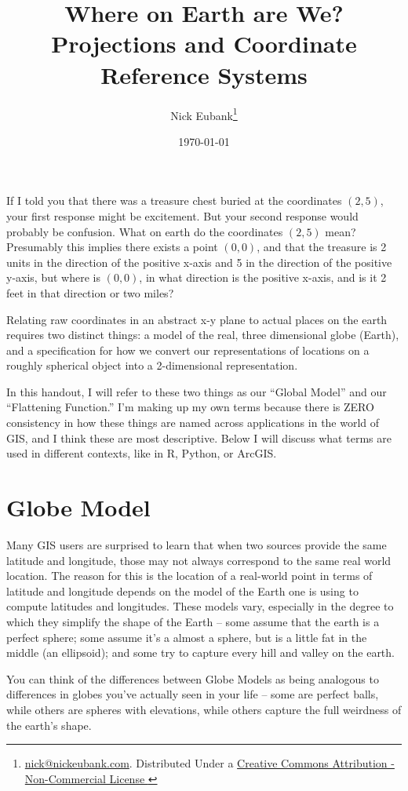 \documentclass[11pt]{article}
\title{Where on Earth are We? \\ Projections and Coordinate Reference Systems}
\author{Nick Eubank\footnote{\href{mailto:nick@nickeubank.com}{nick@nickeubank.com}. Distributed Under a \href{https://creativecommons.org/licenses/by-nc/4.0/}{Creative Commons Attribution - Non-Commercial License \ccbync}}}
\date{\today}
\begin{document}
\maketitle

If I told you that there was a treasure chest buried at the coordinates $(2, 5)$, your first response might be excitement. But your second response would probably be confusion. What on earth do the coordinates $(2, 5)$ mean? Presumably this implies there exists a point $(0, 0)$, and that the treasure is 2 units in the  direction of the positive x-axis and 5 in the direction of the positive y-axis, but where is $(0,0)$, in what direction is the positive x-axis, and is it 2 feet in that direction or two miles?

Relating raw coordinates in an abstract x-y plane to actual places on the earth requires two distinct things: a model of the real, three dimensional globe (Earth), and a specification for how we convert our representations of locations on a roughly spherical object into a 2-dimensional representation.

In this handout, I will refer to these two things as our ``Global Model'' and our ``Flattening Function.'' I'm making up my own terms because there is ZERO consistency in how these things are named across applications in the world of GIS, and I think these are most descriptive. Below I will discuss what terms are used in different contexts, like in R, Python, or ArcGIS.


\section{Globe Model}

Many GIS users are surprised to learn that when two sources provide the same latitude and longitude, those may not always correspond to the same real world location. The reason for this is the location of a real-world point in terms of latitude and longitude depends on the model of the Earth one is using to compute latitudes and longitudes. These models vary, especially in the degree to which they simplify the shape of the Earth -- some assume that the earth is a perfect sphere; some assume it's a almost a sphere, but is a little fat in the middle (an ellipsoid); and some try to capture every hill and valley on the earth.

You can think of the differences between Globe Models as being analogous to differences in globes you've actually seen in your life -- some are perfect balls, while others are spheres with elevations, while others capture the full weirdness of the earth's shape.
\end{document}
